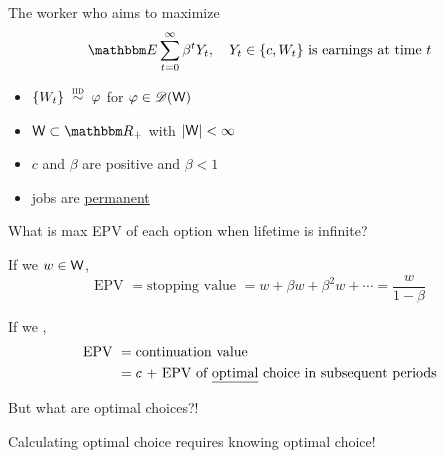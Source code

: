\begin{frame}
    
    The worker who aims to maximize 
    \begin{equation}
        \EE \sum_{t=0}^{\infty} \beta^t Y_t,
        \quad 
        \text{$Y_t \in \{c, W_t\}$ is earnings at time $t$}
    \end{equation}

        \vspace{0.4em}
    \begin{itemize}
        \item $\{ W_t \} \stackrel{\textrm{ {\sc iid }}} {\sim} \varphi$ for $\varphi \in \mathscr D(\mathsf W)$ 
        \vspace{0.4em}
        \item $\Wsf \subset \RR_+$ with $|\mathsf W| < \infty$
        \vspace{0.4em}
        \item $c$ and $\beta$ are positive and $\beta < 1$
        \vspace{0.4em}
        \item jobs are \underline{permanent} 
    \end{itemize}


\end{frame}


\begin{frame}
    
    What is max EPV of each option when lifetime is infinite?  

        \vspace{0.4em}
    If we  $w \in \mathsf W$,
    \begin{equation*}
        \text{EPV }
        = \text{stopping value }
        = w + \beta w + \beta^2 w + \cdots 
        = \frac{w}{1 - \beta}
    \end{equation*}

        \vspace{0.4em}
    If we ,
    \begin{align*}
        \text{EPV }
        & = \text{continuation value }
        \\
        & = \text{$c$ + EPV of \underline{optimal} choice in subsequent periods}
    \end{align*}

        \vspace{0.4em}
    But what are optimal choices?!
        \vspace{0.4em}

    Calculating optimal choice requires knowing optimal choice!

\end{frame}

